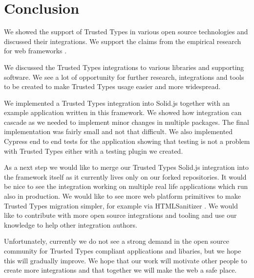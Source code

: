 \chapter{Conclusion}


We showed the support of Trusted Types in various open source technologies and discussed their
integrations. We support the claims from the empirical research for web frameworks
\cite{tt_web_framework_paper}.

We discussed the Trusted Types integrations to various libraries and supporting software. We see a
lot of opportunity for further research, integrations and tools to be created to make Trusted Types
usage easier and more widespread.

We implemented a Trusted Types integration into Solid.js together with an example application
written in this framework. We showed how integration can cascade as we needed to implement minor
changes in multiple packages. The final implementation was fairly small and not that difficult. We
also implemented Cypress end to end tests for the application showing that testing is not a problem
with Trusted Types either with a testing plugin we created.

As a next step we would like to merge our Trusted Types Solid.js integration into the framework
itself as it currently lives only on our forked repositories. It would be nice to see the
integration working on multiple real life applications which run also in production. We would like
to see more web platform primitives to make Trusted Types migration simpler, for example via
HTMLSanitizer \cite{tt_report_mid2021}. We would like to contribute with more open source
integrations and tooling and use our knowledge to help other integration authors.

Unfortunately, currently we do not see a strong demand in the open source community for Trusted
Types compliant applications and libaries, but we hope this will gradually improve. We hope that our
work will motivate other people to create more integrations and that together we will make the web a
safe place.
